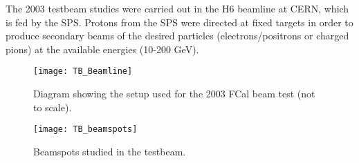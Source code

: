 The 2003 testbeam studies were carried out in the H6 beamline at CERN, which is fed by the SPS. Protons from the SPS were directed at fixed targets in order to produce secondary beams of the desired particles (electrons/positrons or charged pions) at the available energies (10-200 GeV). 

\begin{figure}[tb]
\begin{center}
\texttt{[image: TB\_Beamline]}
\end{center}
\caption[Beamline setup for the 2003 beam test]{Diagram showing the setup used for the 2003 FCal beam test (not to scale).}
\label{fig_TB_beamline}
\end{figure}

\begin{figure}[tb]
\begin{center}
\texttt{[image: TB\_beamspots]}
\end{center}
\caption[Beamspots studied in the testbeam]{Beamspots studied in the testbeam.}
\label{fig_TB_beamspots}
\end{figure}


